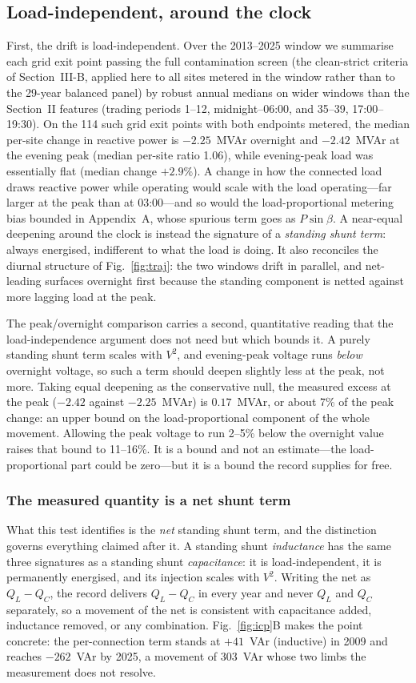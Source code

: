 \documentclass[journal]{IEEEtran}
\begin{document}
\subsection{Load-independent, around the clock}
First, the drift is load-independent. Over the 2013--2025 window we summarise
each grid exit point passing the full contamination screen (the clean-strict
criteria of Section~III-B, applied here to all sites metered in the window
rather than to the 29-year balanced panel) by robust annual medians on wider
windows than the Section~II features (trading periods 1--12, midnight--06:00,
and 35--39, 17:00--19:30). On the 114 such grid exit points with both endpoints
metered, the median per-site change in reactive power is $-2.25$~MVAr overnight
and $-2.42$~MVAr at the evening peak (median per-site ratio 1.06), while
evening-peak load was essentially flat (median change $+2.9\%$). A change in how
the connected load draws reactive power while operating would scale with the
load operating---far larger at the peak than at 03:00---and so would the
load-proportional metering bias bounded in Appendix~A, whose spurious term goes
as $P\sin\beta$. A near-equal deepening around the clock is instead the
signature of a \emph{standing shunt term}: always energised, indifferent to
what the load is doing. It also reconciles the diurnal structure of
Fig.~\ref{fig:traj}: the two windows drift in parallel, and net-leading surfaces
overnight first because the standing component is netted against more lagging
load at the peak.

The peak/overnight comparison carries a second, quantitative reading that the
load-independence argument does not need but which bounds it. A purely standing
shunt term scales with $V^2$, and evening-peak voltage runs \emph{below} overnight
voltage, so such a term should deepen slightly less at the peak, not more. Taking
equal deepening as the conservative null, the measured excess at the peak
($-2.42$ against $-2.25$~MVAr) is $0.17$~MVAr, or about 7\% of the peak change:
an upper bound on the load-proportional component of the whole movement. Allowing
the peak voltage to run 2--5\% below the overnight value raises that bound to
11--16\%. It is a bound and not an estimate---the load-proportional part could be
zero---but it is a bound the record supplies for free.

\subsubsection*{The measured quantity is a net shunt term}
What this test identifies is the \emph{net} standing shunt term, and the
distinction governs everything claimed after it. A standing shunt
\emph{inductance} has the same three signatures as a standing shunt
\emph{capacitance}: it is load-independent, it is permanently energised, and its
injection scales with $V^2$. Writing the net as $Q_L-Q_C$, the record delivers
$Q_L-Q_C$ in every year and never $Q_L$ and $Q_C$ separately, so a movement of the
net is consistent with capacitance added, inductance removed, or any combination.
Fig.~\ref{fig:icp}B makes the point concrete: the per-connection term stands at
$+41$~VAr (inductive) in 2009 and reaches $-262$~VAr by 2025, a movement of
303~VAr whose two limbs the measurement does not resolve.
\end{document}
